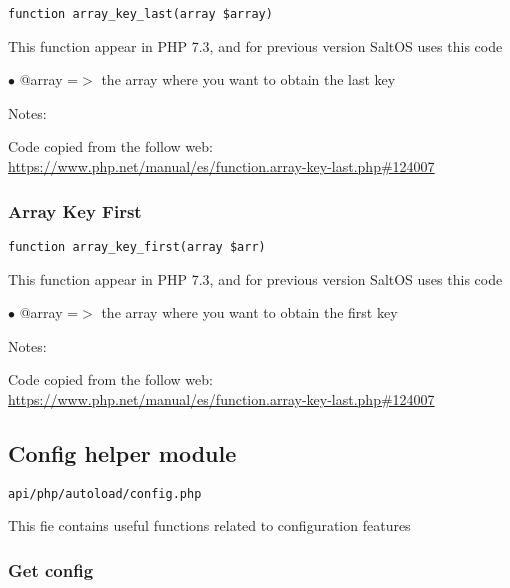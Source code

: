 \documentclass[a4paper]{article}
\def\htmladdnormallink#1#2{\href{#2}{#1}}
\begin{document}
\begin{lstlisting}
function array_key_last(array $array)
\end{lstlisting}

This function appear in PHP 7.3, and for previous version SaltOS
uses this code

\begin{compactitem}
\item[\color{myblue}$\bullet$] @array =$>$ the array where you want to obtain the last key
\end{compactitem}

Notes:

Code copied from the follow web:
\htmladdnormallink{https://www.php.net/manual/es/function.array-key-last.php\#124007}{https://www.php.net/manual/es/function.array-key-last.php\#124007}

\hypertarget{toc76}{}
\subsubsection{Array Key First}

\begin{lstlisting}
function array_key_first(array $arr)
\end{lstlisting}

This function appear in PHP 7.3, and for previous version SaltOS
uses this code

\begin{compactitem}
\item[\color{myblue}$\bullet$] @array =$>$ the array where you want to obtain the first key
\end{compactitem}

Notes:

Code copied from the follow web:
\htmladdnormallink{https://www.php.net/manual/es/function.array-key-last.php\#124007}{https://www.php.net/manual/es/function.array-key-last.php\#124007}

\hypertarget{toc77}{}
\subsection{Config helper module}

\begin{lstlisting}
api/php/autoload/config.php
\end{lstlisting}

This fie contains useful functions related to configuration features

\hypertarget{toc78}{}
\subsubsection{Get config}
\end{document}
